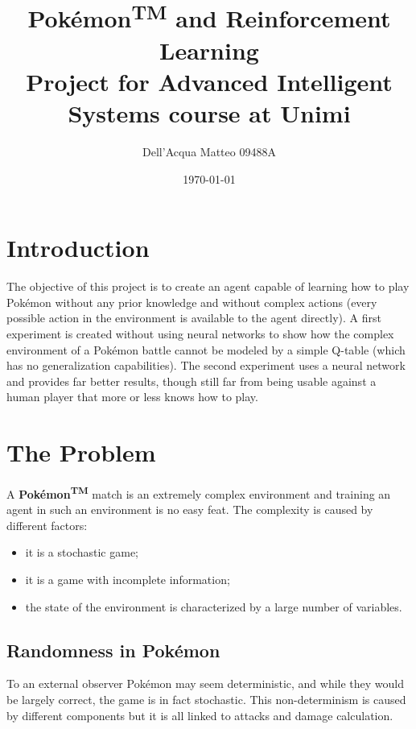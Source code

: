 \documentclass{article}
\title{Pokémon\textsuperscript{\small TM} and Reinforcement Learning\\ \large Project for Advanced Intelligent Systems course at Unimi}
\author{Dell'Acqua Matteo 09488A}
\date{\today}
\begin{document}
\maketitle
\newpage
\tableofcontents
\newpage


\section{Introduction}

The objective of this project is to create an agent capable of learning how to play Pokémon without any prior knowledge and without complex actions (every possible action in the environment is available to the agent directly).
A first experiment is created without using neural networks to show how the complex environment of a Pokémon battle cannot be modeled by a simple Q-table (which has no generalization capabilities).
The second experiment uses a neural network and provides far better results, though still far from being usable against a human player that more or less knows how to play.

\section{The Problem}

A \textbf{Pokémon\textsuperscript{\tiny TM}} match is an extremely complex environment and training an agent in such an environment is no easy feat. The complexity is caused by different factors:
\begin{itemize}
    \item it is a stochastic game;
    \item it is a game with incomplete information;
    \item the state of the environment is characterized by a large number of variables.
\end{itemize}

\subsection{Randomness in Pokémon}

To an external observer Pokémon may seem deterministic, and while they would be largely correct, the game is in fact stochastic. This non-determinism is caused by different components but it is all linked to attacks and damage calculation.
\end{document}

